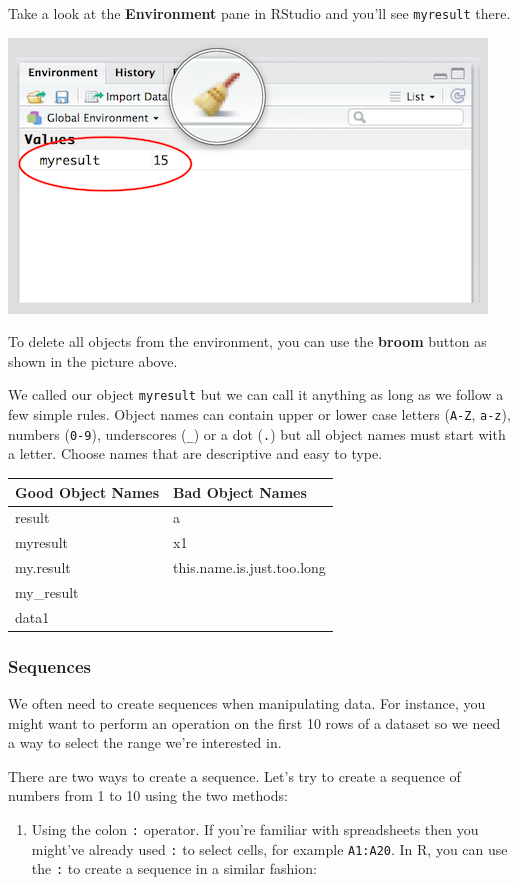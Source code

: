 \documentclass[]{article}
\providecommand{\tightlist}{%
  \setlength{\itemsep}{0pt}\setlength{\parskip}{0pt}}
\begin{document}
Take a look at the \textbf{Environment} pane in RStudio and you'll see \texttt{myresult} there.

\includegraphics{./img/rstudio_env.png}

To delete all objects from the environment, you can use the \textbf{broom} button as shown in the picture above.

We called our object \texttt{myresult} but we can call it anything as long as we follow a few simple rules. Object names can contain upper or lower case letters (\texttt{A-Z}, \texttt{a-z}), numbers (\texttt{0-9}), underscores (\texttt{\_}) or a dot (\texttt{.}) but all object names must start with a letter. Choose names that are descriptive and easy to type.

\begin{longtable}[]{@{}ll@{}}
\toprule
Good Object Names & Bad Object Names\tabularnewline
\midrule
\endhead
result & a\tabularnewline
myresult & x1\tabularnewline
my.result & this.name.is.just.too.long\tabularnewline
my\_result &\tabularnewline
data1 &\tabularnewline
\bottomrule
\end{longtable}

\hypertarget{sequences}{%
\subsubsection{Sequences}\label{sequences}}

We often need to create sequences when manipulating data. For instance, you might want to perform an operation on the first 10 rows of a dataset so we need a way to select the range we're interested in.

There are two ways to create a sequence. Let's try to create a sequence of numbers from 1 to 10 using the two methods:

\begin{enumerate}
\def\labelenumi{\arabic{enumi}.}
\tightlist
\item
  Using the colon \texttt{:} operator. If you're familiar with spreadsheets then you might've already used \texttt{:} to select cells, for example \texttt{A1:A20}. In R, you can use the \texttt{:} to create a sequence in a similar fashion:
\end{enumerate}
\end{document}

